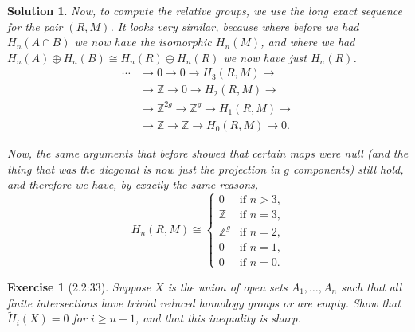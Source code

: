 \documentclass{article}
\theoremstyle{plain}
\newtheorem*{ex}{Exercise}
\theoremstyle{nonumberplain}
\newtheorem{sol}{Solution}
\newcommand{\Z}{\mathbb{Z}}
\begin{document}
\begin{sol}
\medskip

Now, to compute the relative groups, we use the long exact sequence for the pair $(R,M)$. It looks very similar, because where before we had $H_n(A \cap B)$ we now have the isomorphic $H_n(M)$, and where we had $H_n(A) \oplus H_n(B) \cong H_n(R) \oplus H_n(R)$ we now have just $H_n(R)$.
\begin{equation}
\begin{aligned}
\cdots &\to 0 \to 0 \to H_3(R,M) \to \\
&\to \Z \to 0 \to H_2(R,M) \to\\
&\to \Z^{2g} \to \Z^{g} \to H_1(R,M) \to\\
&\to \Z \to \Z \to H_0(R,M) \to 0.
\end{aligned}
\end{equation}

Now, the same arguments that before showed that certain maps were null (and the thing that was the diagonal is now just the projection in $g$ components) still hold, and therefore we have, by exactly the same reasons,
\begin{equation}
H_n(R,M) \cong \begin{cases}
0 & \text{if $n > 3$,}\\
\Z & \text{if $n = 3$,}\\
\Z^{g} & \text{if $n = 2$,}\\
0 & \text{if $n = 1$,}\\
0 & \text{if $n = 0$.}
\end{cases}
\end{equation}
\end{sol}

\begin{ex}[2.2:33]
Suppose $X$ is the union of open sets $A_1, \dots, A_n$ such that all finite intersections have trivial reduced homology groups or are empty. Show that $\tilde H_i(X) = 0$ for $i \geq n-1$, and that this inequality is sharp.
\end{ex}
\end{document}
